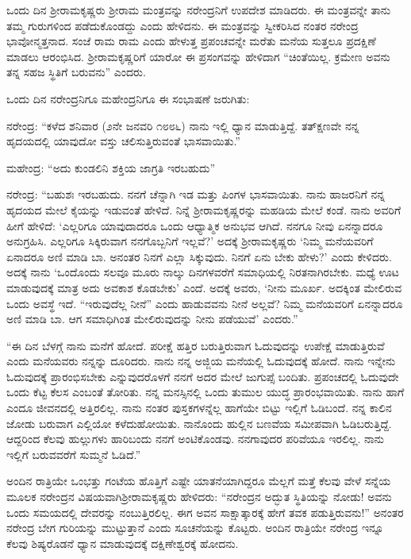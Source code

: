 ಒಂದು ದಿನ ಶ‍್ರೀರಾಮಕೃಷ್ಣರು ಶ‍್ರೀರಾಮ ಮಂತ್ರವನ್ನು ನರೇಂದ್ರನಿಗೆ ಉಪದೇಶ ಮಾಡಿದರು. ಈ ಮಂತ್ರವನ್ನೇ ತಾನು ತಮ್ಮ ಗುರುಗಳಿಂದ ಪಡೆದುಕೊಂಡದ್ದು ಎಂದು ಹೇಳಿದನು. ಈ ಮಂತ್ರವನ್ನು ಸ್ವೀಕರಿಸಿದ ನಂತರ ನರೇಂದ್ರ ಭಾವೋನ್ಮತ್ತನಾದ. ಸಂಜೆ ರಾಮ ರಾಮ ಎಂದು ಹೇಳುತ್ತ ಪ್ರಪಂಚವನ್ನೇ ಮರೆತು ಮನೆಯ ಸುತ್ತಲೂ ಪ್ರದಕ್ಷಿಣೆ ಮಾಡಲು ಆರಂಭಿಸಿದ. ಶ‍್ರೀರಾಮಕೃಷ್ಣರಿಗೆ ಯಾರೋ ಈ ಪ್ರಸಂಗವನ್ನು ಹೇಳಿದಾಗ “ಚಿಂತೆಯಿಲ್ಲ. ಕ್ರಮೇಣ ಅವನು ತನ್ನ ಸಹಜ ಸ್ಥಿತಿಗೆ ಬರುವನು” ಎಂದರು.

ಒಂದು ದಿನ ನರೇಂದ್ರನಿಗೂ ಮಹೇಂದ್ರನಿಗೂ ಈ ಸಂಭಾಷಣೆ ಜರುಗಿತು:

ನರೇಂದ್ರ: “ಕಳೆದ ಶನಿವಾರ (೨ನೇ ಜನವರಿ ೧೮೮೬) ನಾನು ಇಲ್ಲಿ ಧ್ಯಾನ ಮಾಡುತ್ತಿದ್ದೆ. ತತ್‍ಕ್ಷಣವೇ ನನ್ನ ಹೃದಯದಲ್ಲಿ ಯಾವುದೋ ವಸ್ತು ಚಲಿಸುತ್ತಿರುವಂತೆ ಭಾಸವಾಯಿತು.”

ಮಹೇಂದ್ರ: “ಅದು ಕುಂಡಲಿನಿ ಶಕ್ತಿಯ ಜಾಗ್ರತಿ ಇರಬಹುದು”

ನರೇಂದ್ರ: “ಬಹುಶಃ ಇರಬಹುದು. ನನಗೆ ಚೆನ್ನಾಗಿ ಇಡ ಮತ್ತು ಪಿಂಗಳ ಭಾಸವಾಯಿತು. ನಾನು ಹಾಜರನಿಗೆ ನನ್ನ ಹೃದಯದ ಮೇಲೆ ಕೈಯನ್ನು ಇಡುವಂತೆ ಹೇಳಿದೆ. ನಿನ್ನೆ ಶ‍್ರೀರಾಮಕೃಷ್ಣರನ್ನು ಮಹಡಿಯ ಮೇಲೆ ಕಂಡೆ. ನಾನು ಅವರಿಗೆ ಹೀಗೆ ಹೇಳಿದೆ: ‘ಎಲ್ಲರಿಗೂ ಯಾವುದಾದರೂ ಒಂದು ಆಧ್ಯಾತ್ಮಿಕ ಅನುಭವ ಆಗಿದೆ. ನನಗೂ ನೀವು ಏನನ್ನಾದರೂ ಅನುಗ್ರಹಿಸಿ. ಎಲ್ಲರಿಗೂ ಸಿಕ್ಕಿರುವಾಗ ನನಗೊಬ್ಬನಿಗೆ ಇಲ್ಲವೆ?’ ಅದಕ್ಕೆ ಶ‍್ರೀರಾಮಕೃಷ್ಣರು ‘ನಿಮ್ಮ ಮನೆಯವರಿಗೆ ಏನಾದರೂ ಅಣಿ ಮಾಡಿ ಬಾ. ಅನಂತರ ನಿನಗೆ ಎಲ್ಲಾ ಸಿಕ್ಕುವುದು. ನಿನಗೆ ಏನು ಬೇಕು ಹೇಳು?’ ಎಂದು ಕೇಳಿದರು. ಅದಕ್ಕೆ ನಾನು ‘ಒಂದೊಂದು ಸಲವೂ ಮೂರು ನಾಲ್ಕು ದಿನಗಳವರೆಗೆ ಸಮಾಧಿಯಲ್ಲಿ ನಿರತನಾಗಿರಬೇಕು. ಮಧ್ಯೆ ಊಟ ಮಾಡುವುದಕ್ಕೆ ಮಾತ್ರ ಅದು ಅವಕಾಶ ಕೊಡಬೇಕು’ ಎಂದೆ. ಅದಕ್ಕೆ ಅವರು, ‘ನೀನು ಮೂರ್ಖ. ಅದಕ್ಕಿಂತ ಮೇಲಿರುವ ಒಂದು ಅವಸ್ಥೆ ಇದೆ. “ಇರುವುದೆಲ್ಲ ನೀನೆ” ಎಂದು ಹಾಡುವವನು ನೀನೆ ಅಲ್ಲವೆ? ನಿಮ್ಮ ಮನೆಯವರಿಗೆ ಏನನ್ನಾದರೂ ಅಣಿ ಮಾಡಿ ಬಾ. ಆಗ ಸಮಾಧಿಗಿಂತ ಮೇಲಿರುವುದನ್ನು ನೀನು ಪಡೆಯುವೆ’ ಎಂದರು.”

“ಈ ದಿನ ಬೆಳಗ್ಗೆ ನಾನು ಮನೆಗೆ ಹೋದೆ. ಪರೀಕ್ಷೆ ಹತ್ತಿರ ಬರುತ್ತಿರುವಾಗ ಓದುವುದನ್ನು ಉಪೇಕ್ಷೆ ಮಾಡುತ್ತಿರುವೆ ಎಂದು ಮನೆಯವರು ನನ್ನನ್ನು ದೂರಿದರು. ನಾನು ನನ್ನ ಅಜ್ಜಿಯ ಮನೆಯಲ್ಲಿ ಓದುವುದಕ್ಕೆ ಹೋದೆ. ನಾನು ಇನ್ನೇನು ಓದುವುದಕ್ಕೆ ಪ್ರಾರಂಭಿಸಬೇಕು ಎನ್ನುವುದರೊಳಗೆ ನನಗೆ ಅದರ ಮೇಲೆ ಜುಗುಪ್ಸೆ ಬಂದಿತು. ಪ್ರಪಂಚದಲ್ಲಿ ಓದುವುದೇ ಒಂದು ಕೆಟ್ಟ ಕೆಲಸ ಎಂಬಂತೆ ತೋರಿತು. ನನ್ನ ಮನಸ್ಸಿನಲ್ಲಿ ಒಂದು ತುಮುಲ ಯುದ್ಧ ಪ್ರಾರಂಭವಾಯಿತು. ನಾನು ಹಾಗೆ ಎಂದೂ ಜೀವನದಲ್ಲಿ ಅತ್ತಿರಲಿಲ್ಲ. ನಾನು ನಂತರ ಪುಸ್ತಕಗಳನ್ನೆಲ್ಲ ಹಾಗೆಯೇ ಬಿಟ್ಟು ಇಲ್ಲಿಗೆ ಓಡಿಬಂದೆ. ನನ್ನ ಕಾಲಿನ ಜೋಡು ಬರುವಾಗ ಎಲ್ಲಿಯೋ ಕಳೆದುಹೋಯಿತು. ನಾನೊಂದು ಹುಲ್ಲಿನ ಬಣವೆಯ ಸಮೀಪವಾಗಿ ಓಡಿಬರುತ್ತಿದ್ದೆ. ಆದ್ದರಿಂದ ಕೆಲವು ಹುಲ್ಲುಗಳು ಹಾರಿಬಂದು ನನಗೆ ಅಂಟಿಕೊಂಡವು. ನನಗಾವುದರ ಪರಿವೆಯೂ ಇರಲಿಲ್ಲ. ನಾನು ಇಲ್ಲಿಗೆ ಬರುವವರೆಗೆ ಸುಮ್ಮನೆ ಓಡಿದೆ.”

ಅಂದಿನ ರಾತ್ರಿಯೇ ಒಂಭತ್ತು ಗಂಟೆಯ ಹೊತ್ತಿಗೆ ಎಷ್ಟೇ ಯಾತನೆಯಾಗಿದ್ದರೂ ಮೆಲ್ಲಗೆ ಮತ್ತೆ ಕೆಲವು ವೇಳೆ ಸನ್ನೆಯ ಮೂಲಕ ನರೇಂದ್ರನ ವಿಷಯವಾಗಿ\break ಶ‍್ರೀರಾಮಕೃಷ್ಣರು ಹೇಳಿದರು: “ನರೇಂದ್ರನ ಅದ್ಭುತ ಸ್ಥಿತಿಯನ್ನು ನೋಡು! ಅವನು ಒಂದು ಸಮಯದಲ್ಲಿ ದೇವರನ್ನು ನಂಬುತ್ತಿರಲಿಲ್ಲ. ಈಗ ಅವನ ಸಾಕ್ಷಾತ್ಕಾರಕ್ಕೆ ಹೇಗೆ ತವಕ ಪಡುತ್ತಿರುವನು!” ಅನಂತರ ನರೇಂದ್ರ ಬೇಗ ಗುರಿಯನ್ನು ಮುಟ್ಟುತ್ತಾನೆ ಎಂದು ಸೂಚನೆಯನ್ನು ಕೊಟ್ಟರು. ಅಂದಿನ ರಾತ್ರಿಯೇ ನರೇಂದ್ರ ಇನ್ನೂ ಕೆಲವು ಶಿಷ್ಯರೊಡನೆ ಧ್ಯಾನ ಮಾಡುವುದಕ್ಕೆ ದಕ್ಷಿಣೇಶ್ವರಕ್ಕೆ ಹೋದನು.

